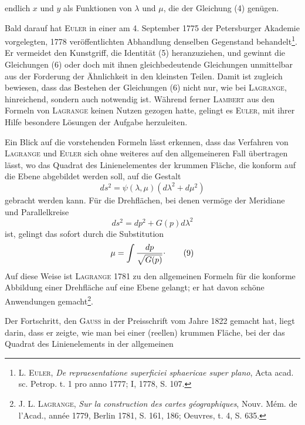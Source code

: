 endlich \(x\) und \(y\) als Funktionen von \(\lambda\) und \(\mu\), die der Gleichung (4) genügen.
\par
Bald darauf hat \textsc{Euler} in einer am 4. September 1775 der Petersburger
Akademie vorgelegten, 1778 veröffentlichten Abhandlung denselben Gegenstand
behandelt\footnote{L. \textsc{Euler}, \textit{De repraesentatione superficiei sphaericae super plano}, Acta acad. sc. Petrop. t. 1 pro anno 1777; I, 1778, S. 107.}. Er vermeidet den Kunstgriff, die Identität (5) heranzuziehen,
und gewinnt die Gleichungen (6) oder doch mit ihnen gleichbedeutende Gleichungen
unmittelbar aus der Forderung der Ähnlichkeit in den kleinsten
Teilen. Damit ist zugleich bewiesen, dass das Bestehen der Gleichungen (6)
nicht nur, wie bei \textsc{Lagrange}, hinreichend, sondern auch notwendig ist. Während
ferner \textsc{Lambert} aus den Formeln von \textsc{Lagrange} keinen Nutzen gezogen
hatte, gelingt es \textsc{Euler}, mit ihrer Hilfe besondere Lösungen der Aufgabe
herzuleiten.
\par
Ein Blick auf die vorstehenden Formeln lässt erkennen, dass das Verfahren
von \textsc{Lagrange} und \textsc{Euler} sich ohne weiteres auf den allgemeineren
Fall übertragen lässt, wo das Quadrat des Linienelementes der krummen Fläche,
die konform auf die Ebene abgebildet werden soll, auf die Gestalt
\begin{equation}ds^2=\psi(\lambda,\mu)(d\lambda^2+d\mu^2)\tag*{(7)}\end{equation}
\noindent gebracht werden kann. Für die Drehflächen, bei denen vermöge der Meridiane
und Parallelkreise
\begin{equation}ds^2=dp^2+G(p)d\lambda^2\tag*{(8)}\end{equation}
\noindent ist, gelingt das sofort durch die Substitution
\begin{equation}\mu=\int\frac{dp}{\sqrt{G(p)}}\mathpunct{\raisebox{.5ex}{.}}\tag*{(9)}\end{equation}
\noindent Auf diese Weise ist \textsc{Lagrange} 1781 zu den allgemeinen Formeln für die
konforme Abbildung einer Drehfläche auf eine Ebene gelangt; er hat davon
schöne Anwendungen gemacht\footnote{J. L. \textsc{Lagrange}, \textit{Sur la construction des cartes géographiques}, Nouv. Mém. de l’Acad., année 1779, Berlin 1781, S. 161, 186; Oeuvres, t. 4, S. 635.}.
\par
Der Fortschritt, den \textsc{Gauss} in der Preisschrift vom Jahre 1822 gemacht
hat, liegt darin, dass er zeigte, wie man bei einer  (reellen)
krummen Fläche, bei der das Quadrat des Linienelements in der allgemeinen
